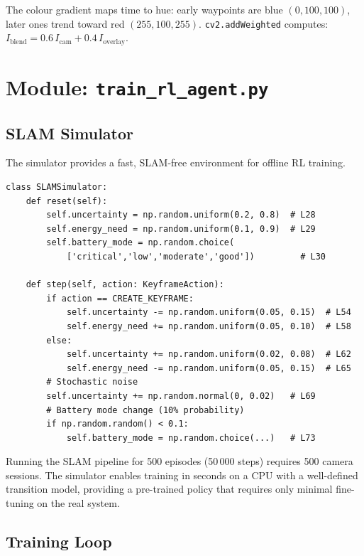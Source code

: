 \documentclass[12pt,a4paper,twoside]{report}
\theoremstyle{definition}
\newcommand{\code}[1]{\texttt{#1}}
\begin{document}
The colour gradient maps time to hue: early waypoints are blue
$(0, 100, 100)$, later ones trend toward red $(255, 100, 255)$.
\code{cv2.addWeighted} computes: $I_{\text{blend}} = 0.6\,I_{\text{cam}} + 0.4\,I_{\text{overlay}}$.

\chapter{Module: \texttt{train\_rl\_agent.py}}

\section{SLAM Simulator}

The simulator provides a fast, SLAM-free environment for offline RL training.

\begin{lstlisting}
class SLAMSimulator:
    def reset(self):
        self.uncertainty = np.random.uniform(0.2, 0.8)  # L28
        self.energy_need = np.random.uniform(0.1, 0.9)  # L29
        self.battery_mode = np.random.choice(
            ['critical','low','moderate','good'])         # L30

    def step(self, action: KeyframeAction):
        if action == CREATE_KEYFRAME:
            self.uncertainty -= np.random.uniform(0.05, 0.15)  # L54
            self.energy_need += np.random.uniform(0.05, 0.10)  # L58
        else:
            self.uncertainty += np.random.uniform(0.02, 0.08)  # L62
            self.energy_need -= np.random.uniform(0.05, 0.15)  # L65
        # Stochastic noise
        self.uncertainty += np.random.normal(0, 0.02)   # L69
        # Battery mode change (10% probability)
        if np.random.random() < 0.1:
            self.battery_mode = np.random.choice(...)   # L73
\end{lstlisting}

\begin{notebox}
Running the SLAM pipeline for 500 episodes (50\,000 steps) requires 500 camera
sessions. The simulator enables training in seconds on a CPU with a well-defined
transition model, providing a pre-trained policy that requires only minimal
fine-tuning on the real system.
\end{notebox}

\section{Training Loop}
\end{document}

